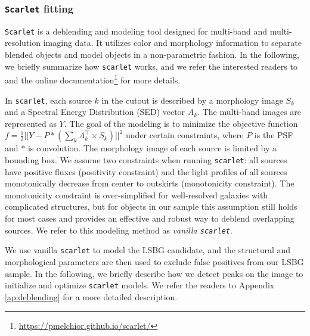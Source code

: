 \documentclass[twocolumn,astrosymb,twocolappendix,linenumbers]{aastex631}
\newcommand{\code}[1]{\texttt{#1}}
\begin{document}
\begin{CJK*}{UTF8}{gbsn}
\subsubsection{\code{Scarlet} fitting}
\code{Scarlet} is a deblending and modeling tool designed for multi-band and multi-resolution imaging data. It utilizes color and morphology information to separate blended objects and model objects in a non-parametric fashion. In the following, we briefly summarize how \code{scarlet} works, and we refer the interested readers to \citet{Melchior2018,Melchior2021} and the online documentation\footnote{\url{https://pmelchior.github.io/scarlet/}} for more details. 

In \code{scarlet}, each source $k$ in the cutout is described by a morphology image $S_k$ and a Spectral Energy Distribution (SED) vector $A_k$. The multi-band images are represented as $Y$. The goal of the modeling is to minimize the objective function $f = \frac{1}{2} ||Y - P \ast (\sum_k A_k^\top \times S_k)||^{2}$ under certain constraints, where $P$ is the PSF and $*$ is convolution. The morphology image of each source is limited by a bounding box. We assume two constraints when running \code{scarlet}: all sources have positive fluxes (positivity constraint) and the light profiles of all sources monotonically decrease from center to outskirts (monotonicity constraint). The monotonicity constraint is over-simplified for well-resolved galaxies with complicated structures, but for objects in our sample this assumption still holds for most cases and provides an effective and robust way to deblend overlapping sources. We refer to this modeling method as \textit{vanilla \code{scarlet}}. 


We use vanilla \code{scarlet} to model the LSBG candidate, and the structural and morphological parameters are then used to exclude false positives from our LSBG sample. In the following, we briefly describe how we detect peaks on the image to initialize and optimize \code{scarlet} models. We refer the readers to Appendix \ref{ap:deblending} for a more detailed description. 


\end{CJK*}
\end{document}
